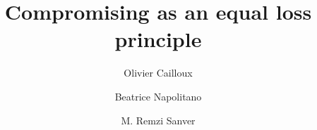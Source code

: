 %
%
%
%
%
%
%
\documentclass[smallextended,numbook]{svjour3}       %
%
\usepackage[utf8]{inputenc}
\smartqed  %
%




\usepackage{pdfpages}

%
%
%
%
%



\title{Compromising as an equal loss principle%
}


\author{Olivier Cailloux \and Beatrice Napolitano \and M. Remzi Sanver }

